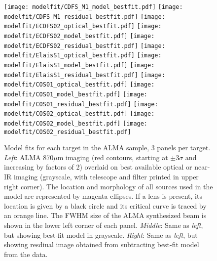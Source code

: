 \documentclass[iop]{emulateapj}
\begin{document}
\begin{figure*}[!tbp]
\begin{centering}
\texttt{[image: modelfit/CDFS\_M1\_model\_bestfit.pdf]}
\texttt{[image: modelfit/CDFS\_M1\_residual\_bestfit.pdf]}
\texttt{[image: modelfit/ECDFS02\_optical\_bestfit.pdf]}
\texttt{[image: modelfit/ECDFS02\_model\_bestfit.pdf]}
\texttt{[image: modelfit/ECDFS02\_residual\_bestfit.pdf]}
\texttt{[image: modelfit/ElaisS1\_optical\_bestfit.pdf]}
\texttt{[image: modelfit/ElaisS1\_model\_bestfit.pdf]}
\texttt{[image: modelfit/ElaisS1\_residual\_bestfit.pdf]}
\texttt{[image: modelfit/COS01\_optical\_bestfit.pdf]}
\texttt{[image: modelfit/COS01\_model\_bestfit.pdf]}
\texttt{[image: modelfit/COS01\_residual\_bestfit.pdf]}
\texttt{[image: modelfit/COS02\_optical\_bestfit.pdf]}
\texttt{[image: modelfit/COS02\_model\_bestfit.pdf]}
\texttt{[image: modelfit/COS02\_residual\_bestfit.pdf]}
\end{centering}

\caption{ Model fits for each target in the ALMA sample, 3 panels per target.
{\it Left}: ALMA 870$\mu$m imaging (red contours, starting at $\pm 3\sigma$ and
increasing by factors of 2) overlaid on best available optical or near-IR
imaging (grayscale, with telescope and filter printed in upper right corner).
The location and morphology of all sources used in the model are represented by
magenta ellipses.  If a lens is present, its location is given by a black
circle and its critical curve is traced by an orange line.  The FWHM size of
the ALMA synthesized beam is shown in the lower left corner of each panel.
{\it Middle}: Same as {\it left}, but showing best-fit model in grayscale.
{\it Right}: Same as {\it left}, but showing resdiual image obtained from
subtracting best-fit model from the data.  \label{fig:uvmodels}}
\addtocounter{figure}{-1}

\end{figure*}
\end{document}
